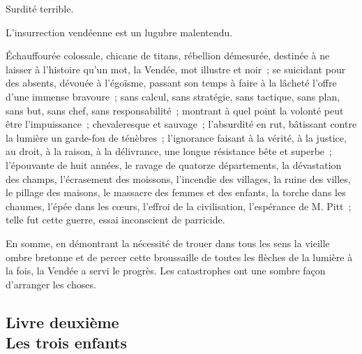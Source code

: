 \documentclass[french,twoside]{book} %
\begin{document}
Surdité terrible.\par
L’insurrection vendéenne est un lugubre malentendu.\par
Échauffourée colossale, chicane de titans, rébellion démesurée, destinée à ne laisser à l’histoire qu’un mot, la Vendée, mot illustre et noir ; se suicidant pour des absents, dévouée à l’égoïsme, passant son temps à faire à la lâcheté l’offre d’une immense bravoure ; sans calcul, sans stratégie, sans tactique, sans plan, sans but, sans chef, sans responsabilité ; montrant à quel point la volonté peut être l’impuissance ; chevaleresque et sauvage ; l’absurdité en rut, bâtissant contre la lumière un garde-fou de ténèbres ; l’ignorance faisant à la vérité, à la justice, au droit, à la raison, à la délivrance, une longue résistance bête et superbe ; l’épouvante de huit années, le ravage de  quatorze départements, la dévastation des champs, l’écrasement des moissons, l’incendie des villages, la ruine des villes, le pillage des maisons, le massacre des femmes et des enfants, la torche dans les chaumes, l’épée dans les cœurs, l’effroi de la civilisation, l’espérance de M. Pitt ; telle fut cette guerre, essai inconscient de parricide.\par
En somme, en démontrant la nécessité de trouer dans tous les sens la vieille ombre bretonne et de percer cette broussaille de toutes les flèches de la lumière à la fois, la Vendée a servi le progrès. Les catastrophes ont une sombre façon d’arranger les choses.\par
  \subsection[{Livre deuxième. Les trois enfants}]{Livre deuxième \\
Les trois enfants}
\label{p3l2}
\end{document}
